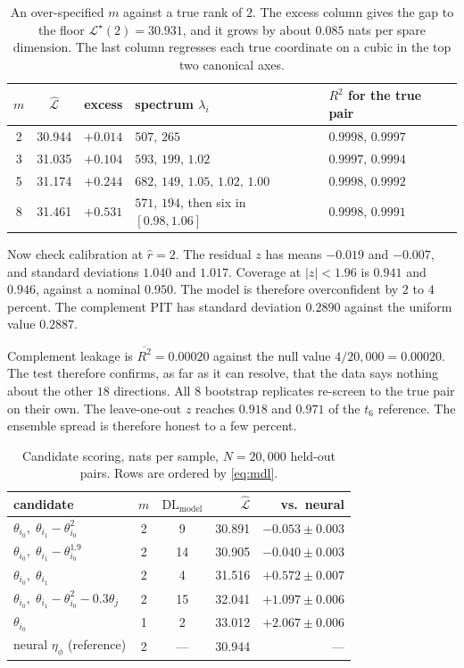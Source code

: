 \documentclass[11pt, letterpaper]{article}
\theoremstyle{definition}
\begin{document}
\begin{table}[h]
\centering
\begin{tabular}{cccll}
\toprule
$m$ & $\hat{\mathcal{L}}$ & excess & spectrum $\lambda_i$ & $R^2$ for the true pair \\
\midrule
2 & 30.944 & $+0.014$ & $507,\, 265$ & $0.9998,\, 0.9997$ \\
3 & 31.035 & $+0.104$ & $593,\, 199,\, 1.02$ & $0.9997,\, 0.9994$ \\
5 & 31.174 & $+0.244$ & $682,\, 149,\, 1.05,\, 1.02,\, 1.00$ & $0.9998,\, 0.9992$ \\
8 & 31.461 & $+0.531$ & $571,\, 194$, then six in $[0.98,1.06]$ & $0.9998,\, 0.9991$ \\
\bottomrule
\end{tabular}
\caption{An over-specified $m$ against a true rank of $2$. The excess column
gives the gap to the floor $\mathcal{L}^\star(2)=30.931$, and it grows by about
$0.085$ nats per spare dimension. The last column regresses each true coordinate
on a cubic in the top two canonical axes.}
\label{tab:overspec}
\end{table}

Now check calibration at $\hat r=2$. The residual $z$ has means $-0.019$ and
$-0.007$, and standard deviations $1.040$ and $1.017$. Coverage at $|z|<1.96$ is
$0.941$ and $0.946$, against a nominal $0.950$. The model is therefore
overconfident by $2$ to $4$ percent. The complement PIT has standard deviation
$0.2890$ against the uniform value $0.2887$.

Complement leakage is $\overline{R^2}=0.00020$ against the null value
$4/20{,}000=0.00020$. The test therefore confirms, as far as it can resolve,
that the data says nothing about the other $18$ directions. All $8$ bootstrap
replicates re-screen to the true pair on their own. The leave-one-out $z$
reaches $0.918$ and $0.971$ of the $t_6$ reference. The ensemble spread is
therefore honest to a few percent.

\begin{table}[h]
\centering
\begin{tabular}{lccrr}
\toprule
candidate & $m$ & $\mathrm{DL}_{\mathrm{model}}$ & $\hat{\mathcal{L}}$ & vs.\ neural \\
\midrule
$\theta_{i_0},\;\theta_{i_1}-\theta_{i_0}^2$      & 2 & 9  & 30.891 & $-0.053\pm0.003$ \\
$\theta_{i_0},\;\theta_{i_1}-\theta_{i_0}^{1.9}$  & 2 & 14 & 30.905 & $-0.040\pm0.003$ \\
$\theta_{i_0},\;\theta_{i_1}$                     & 2 & 4  & 31.516 & $+0.572\pm0.007$ \\
$\theta_{i_0},\;\theta_{i_1}-\theta_{i_0}^2-0.3\theta_j$ & 2 & 15 & 32.041 & $+1.097\pm0.006$ \\
$\theta_{i_0}$                                    & 1 & 2  & 33.012 & $+2.067\pm0.006$ \\
\midrule
neural $\eta_\phi$ (reference)                    & 2 & --- & 30.944 & --- \\
\bottomrule
\end{tabular}
\caption{Candidate scoring, nats per sample, $N=20{,}000$ held-out pairs.
Rows are ordered by \eqref{eq:mdl}.}
\end{table}
\end{document}
